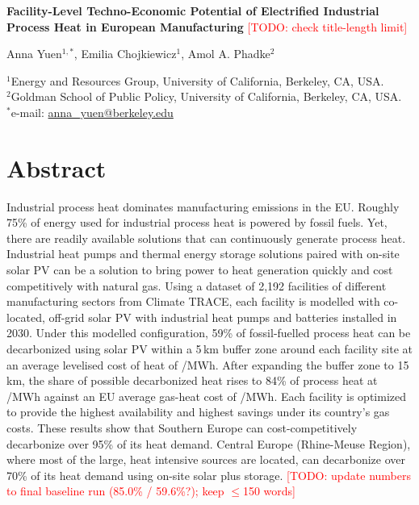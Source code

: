 \documentclass[11pt]{article}
\newcommand{\todo}[1]{\textcolor{red}{[TODO: #1]}}
\begin{document}
\begin{flushleft}
{\Large\bfseries Facility-Level Techno-Economic Potential of Electrified Industrial Process Heat in European Manufacturing}
\todo{check title-length limit}

\bigskip
Anna Yuen$^{1,*}$, Emilia Chojkiewicz$^{1}$, Amol A. Phadke$^{2}$

\medskip
\small
$^{1}$Energy and Resources Group, University of California, Berkeley, CA, USA.\\
$^{2}$Goldman School of Public Policy, University of California, Berkeley, CA, USA.\\
$^{*}$e-mail: \href{mailto:anna_yuen@berkeley.edu}{anna\_yuen@berkeley.edu}
\end{flushleft}

\section*{Abstract}
Industrial process heat dominates manufacturing emissions in the EU. Roughly 75\% of energy used for industrial process heat is powered by fossil fuels. Yet, there are readily available solutions that can continuously generate process heat. Industrial heat pumps and thermal energy storage solutions paired with on-site solar PV can be a solution to bring power to heat generation quickly and cost competitively with natural gas. Using a dataset of 2,192 facilities of different manufacturing sectors from Climate TRACE, each facility is modelled with co-located, off-grid solar PV with industrial heat pumps and batteries installed in 2030. Under this modelled configuration, 59\% of fossil-fuelled process heat can be decarbonized using solar PV within a 5\,km buffer zone around each facility site at an average levelised cost of heat of /MWh. After expanding the buffer zone to 15\,km, the share of possible decarbonized heat rises to 84\% of process heat at /MWh against an EU average gas-heat cost of /MWh. Each facility is optimized to provide the highest availability and highest savings under its country's gas costs. These results show that Southern Europe can cost-competitively decarbonize over 95\% of its heat demand. Central Europe (Rhine-Meuse Region), where most of the large, heat intensive sources are located, can decarbonize over 70\% of its heat demand using on-site solar plus storage.
\todo{update numbers to final baseline run (85.0\% / 59.6\%?); keep $\le$150 words}
\end{document}
